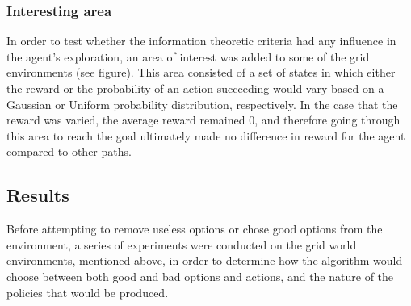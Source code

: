 \documentclass{acm_proc_article-sp}
\begin{document}

\subsubsection{Interesting area}

In order to test whether the information theoretic criteria had any influence in the agent's exploration, an area of interest was added to some of the grid environments (see figure). This area consisted of a set of states in which either the reward or the probability of an action succeeding would vary based on a Gaussian or Uniform probability distribution, respectively. In the case that the reward was varied, the average reward remained 0, and therefore going through this area to reach the goal ultimately made no difference in reward for the agent compared to other paths.


\subsection{Results}


Before attempting to remove useless options or chose good options from the environment, a series of experiments were conducted on the grid world environments, mentioned above, in order to determine how the algorithm would choose between both good and bad options and actions, and the nature of the policies that would be produced.
\end{document}
